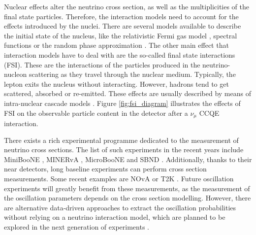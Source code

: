 Nuclear effects alter the neutrino cross section, as well as the multiplicities of the final state particles. Therefore, the interaction models need to account for the effects introduced by the nuclei. There are several models available to describe the initial state of the nucleus, like the relativistic Fermi gas model \cite{Smith1972}, spectral functions \cite{Nakamura2002} or the random phase approximation \cite{Pandey2014}. The other main effect that interaction models have to deal with are the so-called final state interactions (FSI). These are the interactions of the particles produced in the neutrino-nucleon scattering as they travel through the nuclear medium. Typically, the lepton exits the nucleus without interacting. However, hadrons tend to get scattered, absorbed or re-emitted. These effects are usually described by means of intra-nuclear cascade models \cite{Nikolakopoulos2022}. Figure \ref{fig:fsi_diagram} illustrates the effects of FSI on the observable particle content in the detector after a $\nu_{\mu}$ CCQE interaction.

There exists a rich experimental programme dedicated to the measurement of neutrino cross sections. The list of such experiments in the recent years include MiniBooNE \cite{MiniBooNE2010}, MINERvA \cite{MINERvA2016}, MicroBooNE \cite{MicroBooNE2021} and SBND \cite{McConkey2018}. Additionally, thanks to their near detectors, long baseline experiments can perform cross section measurements. Some recent examples are NOvA \cite{Nova2021} or T2K \cite{T2K2019}. Future oscillation experiments will greatly benefit from these measurements, as the measurement of the oscillation parameters depends on the cross section modelling. However, there are alternative data-driven approaches to extract the oscillation probabilities without relying on a neutrino interaction model, which are planned to be explored in the next generation of experiments \cite{Scott2015,Hasnip2023}.